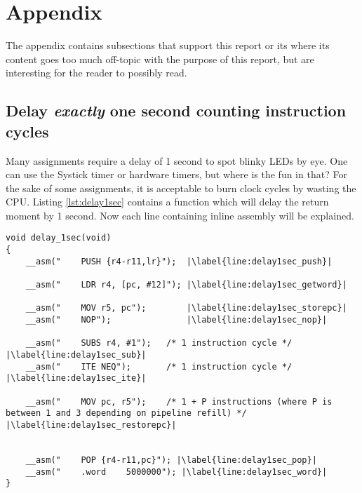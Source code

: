 \section{Appendix}

The appendix contains subsections that support this report or its where its content goes too much off-topic with the purpose of 
this report, but are interesting for the reader to possibly read.

\subsection{Delay \textit{exactly} one second counting instruction cycles}
\label{subsec:appendix_delay}

Many assignments require a delay of 1 second to spot blinky LEDs by eye.
One can use the Systick timer or hardware timers, but where is the fun in that?
For the sake of some assignments, it is acceptable to burn clock cycles by wasting the CPU.
Listing \ref{lst:delay1sec} contains a function which will delay the return moment by 1 second.
Now each line containing inline assembly will be explained.

\begin{lstlisting}[style=CStyle, caption={C function containing inline assembly to perform a delay of \textit{exactly} one second}, captionpos=b, label={lst:delay1sec}, escapechar=|]
void delay_1sec(void)
{
    __asm("    PUSH {r4-r11,lr}");  |\label{line:delay1sec_push}|
 
    __asm("    LDR r4, [pc, #12]"); |\label{line:delay1sec_getword}|
   
    __asm("    MOV r5, pc");        |\label{line:delay1sec_storepc}|
    __asm("    NOP");               |\label{line:delay1sec_nop}|
     
    __asm("    SUBS r4, #1");   /* 1 instruction cycle */ |\label{line:delay1sec_sub}|
    __asm("    ITE NEQ");       /* 1 instruction cycle */ |\label{line:delay1sec_ite}|
   
    __asm("    MOV pc, r5");    /* 1 + P instructions (where P is between 1 and 3 depending on pipeline refill) */ |\label{line:delay1sec_restorepc}|
     
     
    __asm("    POP {r4-r11,pc}"); |\label{line:delay1sec_pop}|
    __asm("    .word    5000000"); |\label{line:delay1sec_word}|
}
\end{lstlisting}

